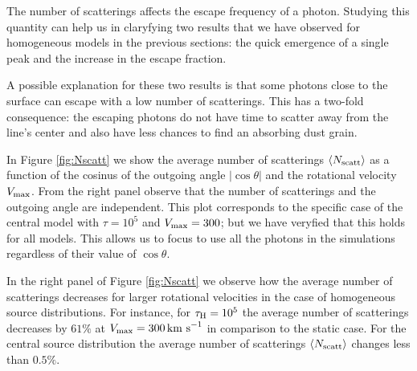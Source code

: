 \documentclass{emulateapj}
\newcommand{\ly}{{\ifmmode{{\rm Ly}\alpha~}\else{Ly$\alpha$~}\fi}}
\newcommand{\kms}{{\ifmmode{{\mathrm{\,km\ s}^{-1}}}\else{\,km~s$^{-1}$}\fi}}
\begin{document}




The number of scatterings affects the escape frequency of a \ly
photon. Studying this quantity can help us in claryfying two results
that we have observed for homogeneous models in the previous sections:
the quick emergence of a single peak and the increase in the escape
fraction.

A possible explanation for these two results is that some photons
close to the surface can escape with a low number of scatterings. This
has a two-fold consequence: the escaping photons do not have time to
scatter away from the line's center and also have less chances to find
an absorbing dust grain.


In Figure \ref{fig:Nscatt} we show the average number of scatterings
$\langle N_{\rm scatt}\rangle$ as a function of the cosinus of the
outgoing angle $|\cos\theta|$ and the rotational velocity
$V_{\rm max}$. From the right panel observe that the number of
scatterings and the outgoing angle are independent. This plot
corresponds to the specific case of the central model with $\tau=10^5$ and
$V_{\rm max}=300$\kms; but we have veryfied that this holds for all
models. This allows us to focus to use all the photons in the
simulations regardless of their value of $\cos\theta$. 

In the right panel of Figure \ref{fig:Nscatt} we observe how the
average number of scatterings decreases for larger rotational
velocities in the case of homogeneous source distributions. For instance, for
$\tau_{\rm H}=10^5$ the average number of scatterings decreases by
$61\%$ at $V_{\rm max}=300\kms$ in comparison to the static case. For
the central source distribution the average number of scatterings
$\langle N_{\rm   scatt}\rangle$ changes less than $0.5\%$. 
\end{document}
